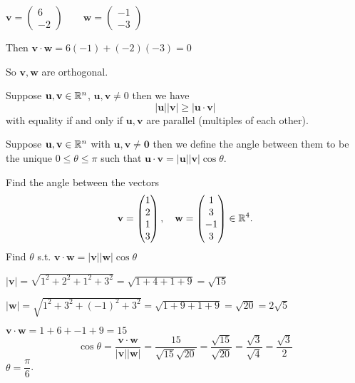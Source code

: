 \documentclass[10pt, a4paper]{article}
\newcommand{\mbf}[1]{\mathbf{#1}}
\begin{document}
\begin{example}
    $\mbf{v} = \begin{pmatrix}
        6 \\
        -2
    \end{pmatrix}\qquad
    \mbf{w} = \begin{pmatrix}
        -1 \\
        -3
    \end{pmatrix}$

    Then $\mbf{v\cdot w} = 6(-1) + (-2)(-3) = 0$

    So $\mbf{v, w}$ are orthogonal.
\end{example}


\begin{theorem}
    Suppose $\mbf{u, v} \in \R ^ n$, $\mbf{u, v} \neq 0$ then we have
    \[
    |\mbf{u}||\mbf{v}| \geq |\mbf{u \cdot v}|
    \]
    with equality if and only if $\mbf{u, v}$ are parallel (multiples of each other).
\end{theorem}

\begin{definition}
    Suppose $\mbf{u, v} \in \R ^ n$ with $\mbf{u, v \neq 0}$ then we define the angle between them to be the unique $0 \leq \theta \leq \pi$ such that $\mbf{u \cdot v} = |\mbf{u}||\mbf{v}|\cos\theta$.
\end{definition}

\begin{example}
    Find the angle between the vectors 
    \[
    \mbf{v} = \begin{pmatrix}
        1 \\ 2 \\ 1 \\ 3
    \end{pmatrix}, \quad \mbf{w} = \begin{pmatrix}
        1 \\ 3 \\ -1 \\ 3
    \end{pmatrix} \in \R ^ 4.
    \]
    Find $\theta$ s.t. $\mbf{v\cdot w} = |\mbf{v}||\mbf{w}|\cos\theta$

    $|\mbf{v}| = \sqrt{1 ^ 2 + 2 ^ 2 + 1 ^ 2 + 3 ^ 2} = \sqrt{1 + 4 + 1 + 9} = \sqrt{15}$
    
    $|\mbf{w}| = \sqrt{1 ^ 2 + 3 ^ 2 + (-1) ^ 2 + 3 ^ 2} = \sqrt{1 + 9 + 1 + 9} = \sqrt{20} = 2\sqrt{5}$

    $\mbf{v \cdot w} = 1 + 6 + -1 + 9 = 15$
    \[
    \cos\theta = \frac{\mbf{v \cdot w}}{|\mbf{v}||\mbf{w}|} = \frac{15}{\sqrt{15}\sqrt{20}} = \frac{\sqrt{15}}{\sqrt{20}} = \frac{\sqrt{3}}{\sqrt{4}} = \frac{\sqrt{3}}{2}
    \]
    $\theta = \dfrac{\pi}{6}$.
\end{example}
\end{document}

